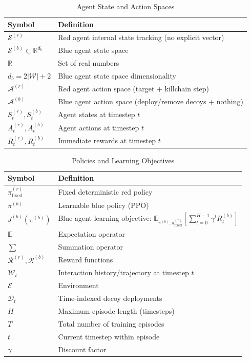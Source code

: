 \documentclass[12pt,oneside]{article}
\begin{document}
\begin{table}[H]
\centering
\caption{Agent State and Action Spaces}
\label{tab:agent_symbols}
\small
\begin{tabular}{|l|p{7cm}|}
\hline
\rowcolor{cwBorder!30} \textbf{Symbol} & \textbf{Definition} \\
\hline
$\mathcal{S}^{(r)}$ & Red agent internal state tracking (no explicit vector) \\
$\mathcal{S}^{(b)} \subset \mathbb{R}^{d_b}$ & Blue agent state space \\
$\mathbb{R}$ & Set of real numbers \\
$d_b = 2|\mathcal{W}| + 2$ & Blue agent state space dimensionality \\
$\mathcal{A}^{(r)}$ & Red agent action space (target + killchain step) \\
$\mathcal{A}^{(b)}$ & Blue agent action space (deploy/remove decoys + nothing) \\
$S_t^{(r)}, S_t^{(b)}$ & Agent states at timestep $t$ \\
$A_t^{(r)}, A_t^{(b)}$ & Agent actions at timestep $t$ \\
$R_t^{(r)}, R_t^{(b)}$ & Immediate rewards at timestep $t$ \\
\hline
\end{tabular}
\end{table}

\begin{table}[H]
\centering
\caption{Policies and Learning Objectives}
\label{tab:policy_symbols}
\small
\begin{tabular}{|l|p{7cm}|}
\hline
\rowcolor{cwBorder!30} \textbf{Symbol} & \textbf{Definition} \\
\hline
$\pi^{(r)}_{\text{fixed}}$ & Fixed deterministic red policy \\
$\pi^{(b)}$ & Learnable blue policy (PPO) \\
$J^{(b)}(\pi^{(b)})$ & Blue agent learning objective: $\mathbb{E}_{\pi^{(b)}, \pi^{(r)}_{\text{fixed}}}\left[\sum_{t=0}^{H-1} \gamma^t R_t^{(b)}\right]$ \\
$\mathbb{E}$ & Expectation operator \\
$\sum$ & Summation operator \\
$\mathcal{R}^{(r)}, \mathcal{R}^{(b)}$ & Reward functions \\
$\mathcal{W}_t$ & Interaction history/trajectory at timestep $t$ \\
$\mathcal{E}$ & Environment \\
$\mathcal{D}_t$ & Time-indexed decoy deployments \\
$H$ & Maximum episode length (timesteps) \\
$T$ & Total number of training episodes \\
$t$ & Current timestep within episode \\
$\gamma$ & Discount factor \\
\hline
\end{tabular}
\end{table}
\end{document}
